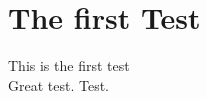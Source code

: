 \documentclass[]{article}
\title{}
\author{}
\begin{document}
\maketitle

\begin{abstract}

\end{abstract}

\section{The first Test}

This is the first test \\
Great test.
Test.


\end{document}
